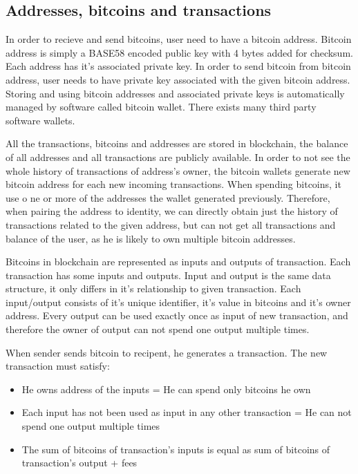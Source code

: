 \documentclass[
  digital, %
  table,   %
  lof,     %
  lot,     %
  oneside
]{fithesis3}
\begin{document}
\subsection{Addresses, bitcoins and transactions}
In order to recieve and send bitcoins, user need to have a bitcoin address.
Bitcoin address is simply a BASE58 encoded public key with 4 bytes added for checksum.
Each address has it's associated private key.
In order to send bitcoin from bitcoin address, user needs to have private key associated with the given bitcoin address.
Storing and using bitcoin addresses and associated private keys is automatically managed
by software called bitcoin wallet. There exists many third party software wallets.

All the transactions, bitcoins and addresses are stored in blockchain,
the balance of all addresses and all transactions are publicly available.
In order to not see the whole history of transactions of address's owner,
the bitcoin wallets generate new bitcoin address for each new incoming transactions. When spending bitcoins, it use o
ne or more of the addresses the wallet generated previously.
Therefore, when pairing the address to identity, we can directly obtain just the history of transactions related to the given
address, but can not get all transactions and balance of the user, as he is likely to own multiple bitcoin addresses.

Bitcoins in blockchain are represented as inputs and outputs of transaction.
Each transaction has some inputs and outputs. 
Input and output is the same data structure, it only differs in it's relationship to given transaction.
Each input/output consists of it's unique identifier, it's value in bitcoins and it's owner address.
Every output can be used exactly once as input of new transaction, and therefore the owner of output can not
spend one output multiple times.

When sender sends bitcoin to recipent, he generates a transaction.
The new transaction must satisfy:
\begin{itemize}
  \item He owns address of the inputs = He can spend only bitcoins he own
  \item Each input has not been used as input in any other transaction = He can not spend one output multiple times
  \item The sum of bitcoins of transaction's inputs is equal as sum of bitcoins of transaction's output + fees
\end{itemize}
\end{document}

